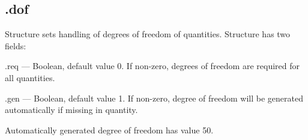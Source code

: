 \documentclass[12pt,a4paper,oneside]{report} %
\begin{document}
\subsection{\textsf{.dof}} %
Structure sets handling of degrees of freedom of quantities. Structure has two fields:
\begin{tightdesc}
        \item [\textsf{.req}] ---  Boolean, default value 0. If non-zero, degrees of freedom are required for all quantities.
        \item [\textsf{.gen}] ---  Boolean, default value 1. If non-zero, degree of freedom will be generated
        automatically if missing in quantity.
\end{tightdesc}
Automatically generated degree of freedom has value 50.
\end{document}
